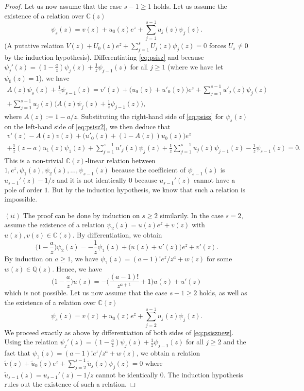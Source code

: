 \documentclass[10pt,a4paper]{amsart}
\begin{document}
\begin{proof}
Let us now assume that the case $s-1\ge 1$ holds. Let us assume the existence of a relation over $\mathbb C(z)$
\begin{equation} \label{eq:psisz}
    \psi_s(z)=v(z)+u_0(z)e^z+\sum_{j=1}^{s-1} u_j(z)\psi_j(z).
\end{equation}
(A putative relation $V(z)+U_0(z)e^z+\sum_{j=1}^{s}U_j(z)\psi_j(z)=0$ forces $U_s\neq 0$ by the induction hypothesis). Differentiating \eqref{eq:psisz} and because 
 $\psi_j'(z)=(1-\frac{a}{z})\psi_j(z)+\frac{1}{z}\psi_{j-1}(z)$
for all $j\ge 1$ (where we have let $\psi_0(z)=1 $), we have 
\begin{multline} \label{eq:psisz2}
  A(z)\psi_s(z)+\frac{1}{z}\psi_{s-1}(z) =
   v'(z)+\big(u_0(z)+u'_0(z)\big)e^z
   +\sum_{j=1}^{s-1}u'_j(z)\psi_j(z)\\
+\sum_{j=1}^{s-1}u_j(z)\big(A(z)\psi_j(z)+\frac{1}{z}\psi_{j-1}(z)\big), 
\end{multline}
where $A(z):=1-a/z$. 
Substituting the right-hand side of \eqref{eq:psisz} for $\psi_s(z)$ on the left-hand side of \eqref{eq:psisz2}, we then deduce that
\begin{multline*}
    v'(z)-A(z)v(z)+\big(u'_0(z)
    +(1-A(z)) u_0(z) \big)e^z\\
    +\frac{1}{z}(z-a)u_1(z)\psi_1(z)+\sum_{j=1}^{s-1}u'_j(z)\psi_{j}(z)+\frac{1}{z}\sum_{j=1}^{s-1} u_j(z)\psi_{j-1}(z)
-\frac{1}{z}\psi_{s-1}(z) =0.
\end{multline*}
This is  a  non-trivial $\mathbb C(z)$-linear relation between 
$ 1, e^z, \psi_1(z), \psi_2(z), \ldots, \psi_{s-1}(z) $ because the coefficient of $\psi_{s-1}(z)$ is $u_{s-1}'(z)-1/z$ and it is  not identically 0 because $u_{s-1}'(z)$ cannot have a pole of order $1$. But by the induction hypothesis, we know that such a relation is impossible. 

\medskip

$(ii)$ The proof can be done by induction on $s\ge 2$ similarily. In the case $s=2$, assume the existence of a relation $\psi_2(z)=u(z)e^z+v(z)$ with $u(z), v(z)\in \mathbb C(z)$. By differentiation, we obtain
$$
\Big(1-\frac{a}{z}\Big)\psi_2(z)=-\frac{1}{z}\psi_1(z)+\big(u(z)+u'(z)\big)e^z+v'(z).
$$
By induction on $a\ge 1$, we have $\psi_1(z)=(a-1)!e^z/z^{a}+w(z)$ for some $w(z)\in \mathbb Q(z)$. Hence, we have 
$$
\Big(1-\frac{a}{z}\Big)u(z)=-\Big(\frac{(a-1)!}{z^{a+1}}+1\Big)u(z)+u'(z)
$$
which is not possible. Let us now assume that the case $s-1\ge 2$ holds, as well as the existence of a relation over $\mathbb C(z)$
\begin{equation} \label{eq:psisznew}
    \psi_s(z)=v(z)+u_0(z)e^z+\sum_{j=2}^{s-1} u_j(z)\psi_j(z).
\end{equation}
We proceed exactly as above by differentiation of both sides of \eqref{eq:psisznew}. Using the relation  $\psi_j'(z)=(1-\frac{a}{z})\psi_j(z)+\frac{1}{z}\psi_{j-1}(z)$
for all $j\ge 2$ and the fact that $\psi_1(z)=(a-1)!e^z/z^{a}+w(z)$, we obtain a relation 
$
\widetilde{v}(z)+\widetilde{u}_0(z)e^z+\sum_{j=2}^{s-1} \widetilde{u}_j(z)\psi_j(z) =0 
$
where $\widetilde{u}_{s-1}(z)=u_{s-1}'(z)-1/z$ 
cannot be identically 0. The induction hypothesis rules out the existence of such a relation.
\end{proof}
\end{document}
